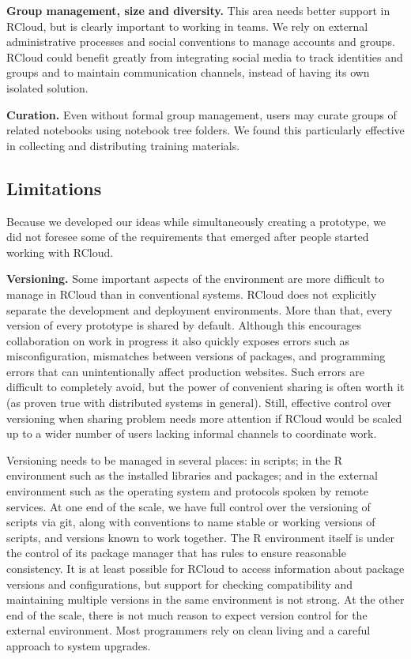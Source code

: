 {\bf Group management, size and diversity.} This area needs better
support in RCloud, but is clearly important to working in teams.
We rely on external administrative processes and social conventions
to manage accounts and groups. RCloud could benefit greatly from
integrating social media to track identities and groups and to maintain
communication channels, instead of having its own isolated solution.

{\bf Curation.} Even without formal group management, users may
curate groups of related notebooks using notebook tree folders.
We found this particularly effective in collecting and distributing
training materials.

\subsection{Limitations}
Because we developed our ideas while simultaneously creating a prototype,
we did not foresee some of the requirements that emerged after
people started working with RCloud.

{\bf Versioning.}
Some important aspects of the environment are more difficult to manage
in RCloud than in conventional systems. RCloud does not explicitly
separate the development and deployment environments. More than that,
every version of every prototype is shared by default. Although this encourages
collaboration on work in progress it also quickly exposes errors such as
misconfiguration, mismatches between versions of packages, and programming
errors that can unintentionally affect production websites. Such errors
are difficult to completely avoid, but the power of convenient sharing is often
worth it (as proven true with distributed systems in general).
Still, effective control over versioning when sharing problem needs more
attention if RCloud would be scaled up to a wider number of users lacking
informal channels to coordinate work.

Versioning needs to be managed in several places: in scripts;
in the R environment such as the installed libraries and packages;
and in the external environment such as the operating system and
protocols spoken by remote services. At one end of the scale, we have
full control over the versioning of scripts via git, along with conventions
to name stable or working versions of scripts, and versions known to work together.
The R environment itself is under the control of its package manager
that has rules to ensure reasonable consistency.
It is at least possible for RCloud to access information about
package versions and configurations, but support for checking compatibility
and maintaining multiple versions in the same environment is not strong.
At the other end of the scale, there is not much reason to expect version
control for the external environment. Most programmers rely on clean living
and a careful approach to system upgrades.

